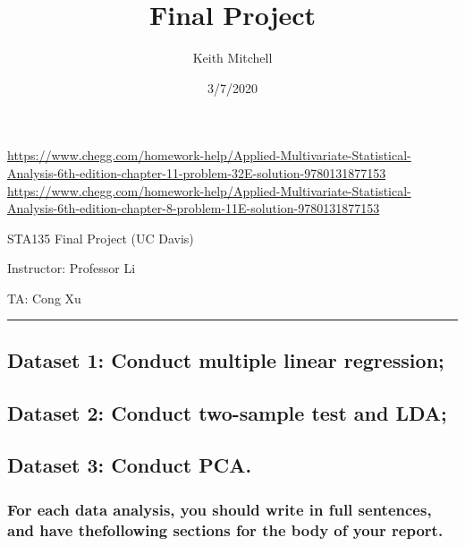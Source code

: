\documentclass[]{article}
\title{Final Project}
\author{Keith Mitchell}
\date{3/7/2020}
\begin{document}
\maketitle

\url{https://www.chegg.com/homework-help/Applied-Multivariate-Statistical-Analysis-6th-edition-chapter-11-problem-32E-solution-9780131877153}
\url{https://www.chegg.com/homework-help/Applied-Multivariate-Statistical-Analysis-6th-edition-chapter-8-problem-11E-solution-9780131877153}

\begin{center}
STA135 Final Project (UC Davis)
\end{center}

\begin{center}
Instructor: Professor Li
\end{center}

\begin{center}
TA: Cong Xu
\end{center}

\begin{center}\rule{0.5\linewidth}{0.5pt}\end{center}

\hypertarget{dataset-1-conduct-multiple-linear-regression}{%
\subsection{Dataset 1: Conduct multiple linear
regression;}\label{dataset-1-conduct-multiple-linear-regression}}

\hypertarget{dataset-2-conduct-two-sample-test-and-lda}{%
\subsection{Dataset 2: Conduct two-sample test and
LDA;}\label{dataset-2-conduct-two-sample-test-and-lda}}

\hypertarget{dataset-3-conduct-pca.}{%
\subsection{Dataset 3: Conduct PCA.}\label{dataset-3-conduct-pca.}}

\hypertarget{for-each-data-analysis-you-should-write-in-full-sentences-and-have-thefollowing-sections-for-the-body-of-your-report.}{%
\subsubsection{For each data analysis, you should write in full
sentences, and have thefollowing sections for the body of your
report.}\label{for-each-data-analysis-you-should-write-in-full-sentences-and-have-thefollowing-sections-for-the-body-of-your-report.}}
\end{document}
